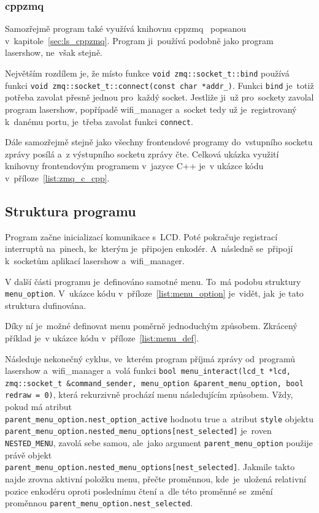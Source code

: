 \subsubsection{cppzmq}
Samozřejmě program také využívá knihovnu cppzmq~\cite{cppzmq} popsanou v~kapitole~\ref{sec:ls_cppzmq}. Program ji~používá podobně jako program lasershow, ne~však stejně.

Největším rozdílem je, že místo funkce \texttt{void zmq::socket_t::bind} používá funkci \texttt{void zmq::socket_t::connect(const char *addr_)}.
Funkci \texttt{bind} je~totiž potřeba zavolat přesně jednou pro~každý socket.
Jestliže ji~už pro~sockety zavolal program lasershow, popřípadě wifi\_manager a~socket tedy už je~registrovaný k~danému portu, je~třeba zavolat funkci \texttt{connect}.

Dále samozřejmě stejně jako všechny frontendové programy do~vstupního socketu zprávy posílá a~z výstupního socketu zprávy čte. Celková ukázka využití knihovny frontendovým programem v~jazyce C++ je~v ukázce kódu v~příloze~\ref{list:zmq_c_cpp}.

\subsection{Struktura programu}
Program začne inicializací komunikace s~LCD.
Poté pokračuje registrací interruptů na~pinech, ke~kterým je~připojen enkodér. A~následně se~připojí k~socketům aplikací lasershow a~wifi\_manager.

V další části programu je~definováno samotné menu. To~má podobu struktury \texttt{menu_option}. V~ukázce kódu v~příloze~\ref{list:menu_option} je~vidět, jak~je tato struktura dufinována.

Díky ní je~možné definovat menu poměrně jednoduchým způsobem. Zkrácený příklad je~v ukázce kódu v~příloze~\ref{list:menu_def}.

Následuje nekonečný cyklus, ve~kterém program příjmá zprávy od~programů lasershow a~wifi\_manager a~volá funkci \texttt{bool menu_interact(lcd_t *lcd, zmq::socket_t &command_sender, menu_option &parent_menu_option, bool redraw = 0)}, která rekurzivně prochází menu následujícím způsobem.
Vždy, pokud má atribut \\
\texttt{parent_menu_option.nest_option_active} hodnotu true a~atribut \texttt{style} objektu \texttt{parent_menu_option.nested_menu_options[nest_selected]} je~roven \texttt{NESTED_MENU}, zavolá sebe samou, ale~jako argument \texttt{parent_menu_option} použije právě objekt \\
\texttt{parent_menu_option.nested_menu_options[nest_selected]}.
Jakmile takto najde zrovna aktivní položku menu, přečte proměnnou, kde~je~uložená relativní pozice enkodéru oproti poslednímu čtení a~dle této proměnné se~změní proměnnou \texttt{parent_menu_option.nest_selected}.

